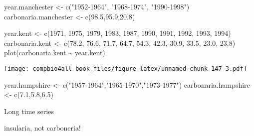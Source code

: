 \documentclass[
]{book}
\newenvironment{Shaded}{\begin{snugshade}}{\end{snugshade}}
\newcommand{\DecValTok}[1]{\textcolor[rgb]{0.00,0.00,0.81}{#1}}
\newcommand{\FloatTok}[1]{\textcolor[rgb]{0.00,0.00,0.81}{#1}}
\newcommand{\FunctionTok}[1]{\textcolor[rgb]{0.00,0.00,0.00}{#1}}
\newcommand{\NormalTok}[1]{#1}
\newcommand{\OtherTok}[1]{\textcolor[rgb]{0.56,0.35,0.01}{#1}}
\newcommand{\SpecialCharTok}[1]{\textcolor[rgb]{0.00,0.00,0.00}{#1}}
\newcommand{\StringTok}[1]{\textcolor[rgb]{0.31,0.60,0.02}{#1}}
\begin{document}
\begin{Shaded}
\begin{Highlighting}[]
\NormalTok{year.manchester }\OtherTok{\textless{}{-}} \FunctionTok{c}\NormalTok{(}\StringTok{"1952{-}1964"}\NormalTok{, }\StringTok{"1968{-}1974"}\NormalTok{, }\StringTok{"1990{-}1998"}\NormalTok{)}
\NormalTok{carbonaria.manchester }\OtherTok{\textless{}{-}} \FunctionTok{c}\NormalTok{(}\FloatTok{98.5}\NormalTok{,}\FloatTok{95.9}\NormalTok{,}\FloatTok{20.8}\NormalTok{)}










\NormalTok{year.kent }\OtherTok{\textless{}{-}} \FunctionTok{c}\NormalTok{(}\DecValTok{1971}\NormalTok{, }\DecValTok{1975}\NormalTok{, }\DecValTok{1979}\NormalTok{, }\DecValTok{1983}\NormalTok{, }\DecValTok{1987}\NormalTok{, }
               \DecValTok{1990}\NormalTok{, }\DecValTok{1991}\NormalTok{, }\DecValTok{1992}\NormalTok{, }\DecValTok{1993}\NormalTok{, }\DecValTok{1994}\NormalTok{)}
\NormalTok{carbonaria.kent }\OtherTok{\textless{}{-}} \FunctionTok{c}\NormalTok{(}\FloatTok{78.2}\NormalTok{, }\FloatTok{76.6}\NormalTok{, }\FloatTok{71.7}\NormalTok{, }\FloatTok{64.7}\NormalTok{, }\FloatTok{54.3}\NormalTok{, }
                     \FloatTok{42.3}\NormalTok{, }\FloatTok{30.9}\NormalTok{, }\FloatTok{33.5}\NormalTok{, }\FloatTok{23.0}\NormalTok{, }\FloatTok{23.8}\NormalTok{)}
\FunctionTok{plot}\NormalTok{(carbonaria.kent }\SpecialCharTok{\textasciitilde{}}\NormalTok{ year.kent)}
\end{Highlighting}
\end{Shaded}

\texttt{[image: compbio4all-book\_files/figure-latex/unnamed-chunk-147-3.pdf]}

\begin{Shaded}
\begin{Highlighting}[]
\NormalTok{year.hampshire }\OtherTok{\textless{}{-}} \FunctionTok{c}\NormalTok{(}\StringTok{"1957{-}1964"}\NormalTok{,}\StringTok{"1965{-}1970"}\NormalTok{,}\StringTok{"1973{-}1977"}\NormalTok{)}
\NormalTok{carbonaria.hampshire }\OtherTok{\textless{}{-}} \FunctionTok{c}\NormalTok{(}\FloatTok{7.1}\NormalTok{,}\FloatTok{5.8}\NormalTok{,}\FloatTok{6.5}\NormalTok{)}
\end{Highlighting}
\end{Shaded}

Long time series

insularia, not carboneria!
\end{document}
